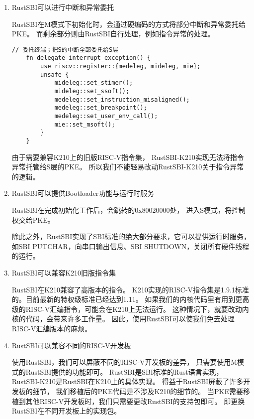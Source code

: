 \begin{enumerate}
    \item RustSBI可以进行中断和异常委托
    
    RustSBI在M模式下初始化时，会通过硬编码的方式将部分中断和异常委托给PKE。
    而剩余部分则由RustSBI自行处理，例如指令异常的处理。

    \begin{lstlisting}[caption={RustSBI的中断和异常委托}, label={lst:rustsbi_interrupt_and_exception}]
    // 委托终端；把S的中断全部委托给S层
    fn delegate_interrupt_exception() {
        use riscv::register::{medeleg, mideleg, mie};
        unsafe {
            mideleg::set_stimer();
            mideleg::set_ssoft();
            medeleg::set_instruction_misaligned();
            medeleg::set_breakpoint();
            medeleg::set_user_env_call();
            mie::set_msoft();
        }
    }
    \end{lstlisting}

    由于需要兼容K210上的旧版RISC-V指令集，
    RustSBI-K210实现无法将指令异常托管给S层的PKE。
    所以我们不能轻易改动RustSBI-K210关于指令异常的逻辑。

    \item RustSBI可以提供Bootloader功能与运行时服务
    
    RustSBI在完成初始化工作后，会跳转的0x80020000处，
    进入S模式，将控制权交给PKE。

    除此之外，RustSBI实现了SBI标准的绝大部分要求，它可以提供运行时服务，
    如SBI PUTCHAR，向串口输出信息、SBI SHUTDOWN，关闭所有硬件线程的运行。

    \item RustSBI可以兼容K210旧版指令集

    RustSBI在K210兼容了高版本的指令。
    K210实现的RISC-V指令集是1.9.1标准的。目前最新的特权级标准已经达到1.11。
    如果我们的内核代码里有用到更高级的RISC-V汇编指令，可能会在K210上无法运行。
    这种情况下，就要改动内核的代码，会带来许多工作量。
    因此，使用RustSBI可以使我们免去处理RISC-V汇编版本的麻烦。

    \item RustSBI可以兼容不同的RISC-V开发板
    
    使用RustSBI，我们可以屏蔽不同的RISC-V开发板的差异，
    只需要使用M模式的RustSBI提供的功能即可。
    RustSBI是SBI标准的Rust语言实现，
    RustSBI-K210是RustSBI在K210上的具体实现。
    得益于RustSBI屏蔽了许多开发板的细节，
    我们移植后的PKE代码是不涉及K210的细节的。
    当PKE需要移植到其他RISC-V开发板时，我们只需要更改RustSBI的支持包即可。
    即更换RustSBI在不同开发板上的实现包。

\end{enumerate}

